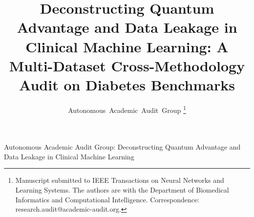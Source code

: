 \documentclass[journal,twocolumn]{IEEEtran}
\begin{document}
\title{Deconstructing Quantum Advantage and Data Leakage in Clinical Machine Learning: A Multi-Dataset Cross-Methodology Audit on Diabetes Benchmarks}

\author{Autonomous~Academic~Audit~Group
\thanks{Manuscript submitted to IEEE Transactions on Neural Networks and Learning Systems. The authors are with the Department of Biomedical Informatics and Computational Intelligence. Correspondence: research.audit@academic-audit.org.}
}

%
{Autonomous Academic Audit Group: Deconstructing Quantum Advantage and Data Leakage in Clinical Machine Learning}

\maketitle
\end{document}
